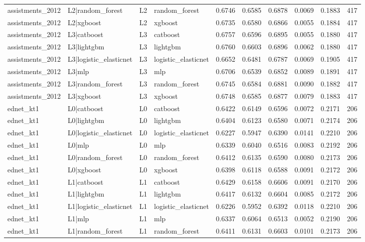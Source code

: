 \begin{table}
\begin{tabular}{llllrrrrrr}
assistments\_2012 & L2|random\_forest & L2 & random\_forest & 0.6746 & 0.6585 & 0.6878 & 0.0069 & 0.1883 & 417 \\
assistments\_2012 & L2|xgboost & L2 & xgboost & 0.6735 & 0.6580 & 0.6866 & 0.0055 & 0.1884 & 417 \\
assistments\_2012 & L3|catboost & L3 & catboost & 0.6757 & 0.6596 & 0.6895 & 0.0055 & 0.1880 & 417 \\
assistments\_2012 & L3|lightgbm & L3 & lightgbm & 0.6760 & 0.6603 & 0.6896 & 0.0062 & 0.1880 & 417 \\
assistments\_2012 & L3|logistic\_elasticnet & L3 & logistic\_elasticnet & 0.6652 & 0.6481 & 0.6787 & 0.0069 & 0.1905 & 417 \\
assistments\_2012 & L3|mlp & L3 & mlp & 0.6706 & 0.6539 & 0.6852 & 0.0089 & 0.1891 & 417 \\
assistments\_2012 & L3|random\_forest & L3 & random\_forest & 0.6745 & 0.6584 & 0.6881 & 0.0090 & 0.1882 & 417 \\
assistments\_2012 & L3|xgboost & L3 & xgboost & 0.6748 & 0.6585 & 0.6877 & 0.0079 & 0.1883 & 417 \\
ednet\_kt1 & L0|catboost & L0 & catboost & 0.6422 & 0.6149 & 0.6596 & 0.0072 & 0.2171 & 206 \\
ednet\_kt1 & L0|lightgbm & L0 & lightgbm & 0.6404 & 0.6123 & 0.6580 & 0.0071 & 0.2174 & 206 \\
ednet\_kt1 & L0|logistic\_elasticnet & L0 & logistic\_elasticnet & 0.6227 & 0.5947 & 0.6390 & 0.0141 & 0.2210 & 206 \\
ednet\_kt1 & L0|mlp & L0 & mlp & 0.6339 & 0.6040 & 0.6516 & 0.0083 & 0.2192 & 206 \\
ednet\_kt1 & L0|random\_forest & L0 & random\_forest & 0.6412 & 0.6135 & 0.6590 & 0.0080 & 0.2173 & 206 \\
ednet\_kt1 & L0|xgboost & L0 & xgboost & 0.6398 & 0.6118 & 0.6588 & 0.0091 & 0.2172 & 206 \\
ednet\_kt1 & L1|catboost & L1 & catboost & 0.6429 & 0.6158 & 0.6606 & 0.0091 & 0.2170 & 206 \\
ednet\_kt1 & L1|lightgbm & L1 & lightgbm & 0.6417 & 0.6132 & 0.6604 & 0.0085 & 0.2172 & 206 \\
ednet\_kt1 & L1|logistic\_elasticnet & L1 & logistic\_elasticnet & 0.6226 & 0.5952 & 0.6392 & 0.0118 & 0.2210 & 206 \\
ednet\_kt1 & L1|mlp & L1 & mlp & 0.6337 & 0.6064 & 0.6513 & 0.0052 & 0.2190 & 206 \\
ednet\_kt1 & L1|random\_forest & L1 & random\_forest & 0.6411 & 0.6131 & 0.6603 & 0.0101 & 0.2173 & 206 \\

\end{tabular}
\end{table}
